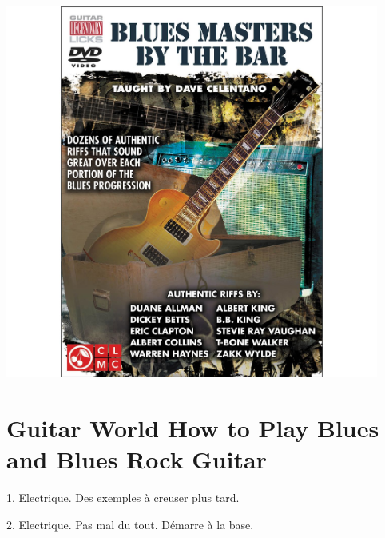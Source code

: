 \documentclass[a4paper]{book}
\begin{document}
\begin{center}
\includegraphics[width=12.277cm,height=12.277cm]{lebluessupportsmethodes-img97.jpg}
\end{center}







\clearpage


\section[Guitar World How to Play Blues and Blues Rock Guitar]{Guitar
World How to Play Blues and Blues Rock Guitar}
\hypertarget{RefHeadingToc156973218262}{}1. Electrique. Des exemples \`a
creuser plus tard.

2. Electrique. Pas mal du tout. D\'emarre \`a la base.
\end{document}
